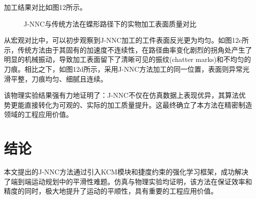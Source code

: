 \documentclass[preprint,12pt]{elsarticle}
\begin{document}
加工结果对比如图12所示。

\begin{figure}[htbp]
    \centering
    \caption{J-NNC与传统方法在蝶形路径下的实物加工表面质量对比}
    \label{fig:physical_exp}
\end{figure}

从宏观对比中，可以初步观察到J-NNC加工的工件表面反光更为均匀。如图12c所示，传统方法由于其固有的加速度不连续性，在路径曲率变化剧烈的拐角处产生了明显的机械振动，导致加工表面留下了清晰可见的振纹(chatter marks)和不均匀的刀痕。相比之下，如图12d所示，采用J-NNC方法加工的同一位置，表面则异常光滑平整，刀痕均匀、细腻且连续。

该物理实验结果强有力地证明了：J-NNC不仅在仿真数据上表现优异，其算法优势更能直接转化为可观的、实际的加工质量提升。这最终确立了本方法在精密制造领域的工程应用价值。

\section{结论}
本文提出的J-NNC方法通过引入KCM模块和捷度约束的强化学习框架，成功解决了端到端运动规划中的平滑性难题。仿真与物理实验均证明，该方法在保证效率和精度的同时，极大地提升了运动的平顺性，具有重要的工程应用价值。

 

\end{document}
